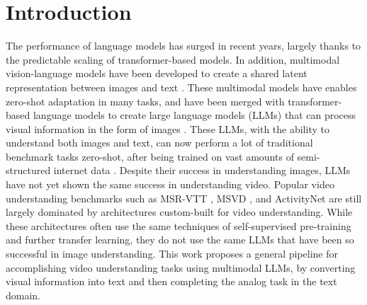 \section{Introduction}

The performance of language models has surged in recent years, largely thanks to the predictable scaling of transformer-based models.
In addition, multimodal vision-language models have been developed to create a shared latent representation between images and text \cite{clip} \cite{coca} \cite{mmbt}.
These multimodal models have enables zero-shot adaptation in many tasks, and have been merged with transformer-based language models to create large language models (LLMs) that can process visual information in the form of images \cite{flamingo} \cite{llava} \cite{gpt4vision} \cite{gemini}.
These LLMs, with the ability to understand both images and text, can now perform a lot of traditional benchmark tasks zero-shot, after being trained on vast amounts of semi-structured internet data \cite{gpt4vision} \cite{clip} \cite{gemini} \cite{flamingo}.
Despite their success in understanding images, LLMs have not yet shown the same success in understanding video.
Popular video understanding benchmarks such as MSR-VTT \cite{}, MSVD \cite{}, and ActivityNet \cite{} are still largely dominated by architectures custom-built for video understanding.
While these architectures often use the same techniques of self-supervised pre-training and further transfer learning, they do not use the same LLMs that have been so successful in image understanding.
This work proposes a general pipeline for accomplishing video understanding tasks using multimodal LLMs, by converting visual information into text and then completing the analog task in the text domain.

